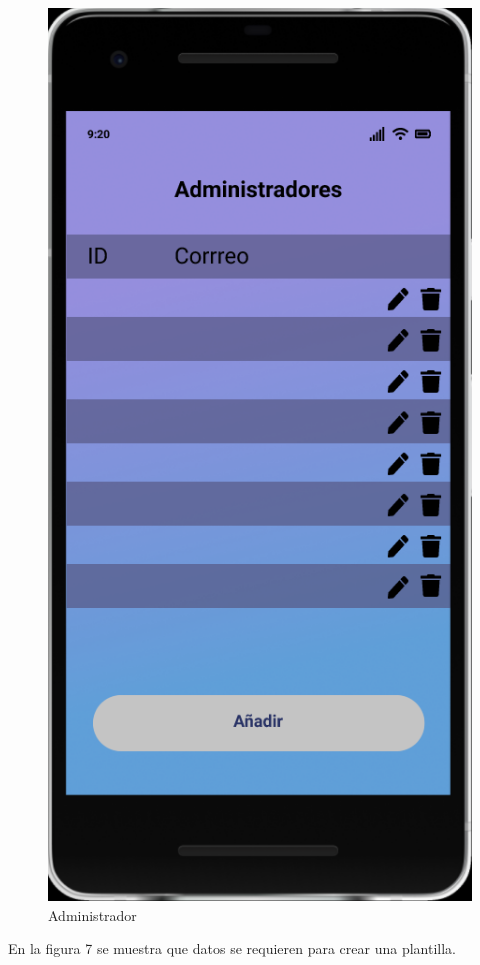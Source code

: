 \documentclass{article}
\begin{document}
\begin{figure}[H]
    \centering
    \includegraphics[scale=0.8]{imgs/Figma/Admins}
    \caption{Administrador}
\end{figure}
En la figura 7 se muestra que datos se requieren para crear una plantilla.
\end{document}
